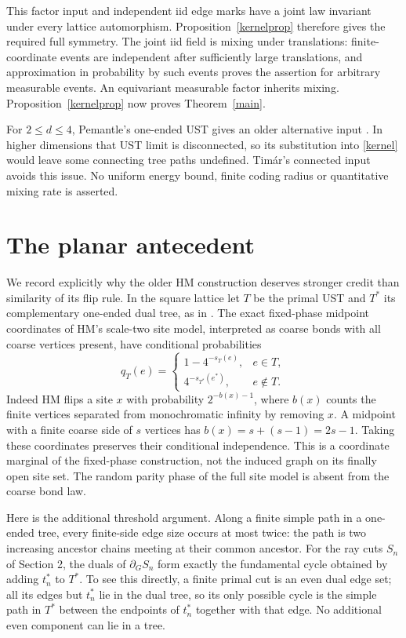 \documentclass[11pt]{article}
\newcommand{\bd}{\partial}
\begin{document}
This factor input and independent iid edge marks have a joint law invariant under every lattice automorphism. Proposition~\ref{kernelprop} therefore gives the required full symmetry. The joint iid field is mixing under translations: finite-coordinate events are independent after sufficiently large translations, and approximation in probability by such events proves the assertion for arbitrary measurable events. An equivariant measurable factor inherits mixing. Proposition~\ref{kernelprop} now proves Theorem~\ref{main}.

For $2\le d\le4$, Pemantle's one-ended UST gives an older alternative input \cite[Theorems 2.3 and 4.3]{P}. In higher dimensions that UST limit is disconnected, so its substitution into \eqref{kernel} would leave some connecting tree paths undefined. Tim\'ar's connected input avoids this issue. No uniform energy bound, finite coding radius or quantitative mixing rate is asserted.

\section{The planar antecedent}\label{planar}
We record explicitly why the older HM construction deserves stronger credit than similarity of its flip rule. In the square lattice let $T$ be the primal UST and $T^*$ its complementary one-ended dual tree, as in \cite[Section 2]{HM}. The exact fixed-phase midpoint coordinates of HM's scale-two site model, interpreted as coarse bonds with all coarse vertices present, have conditional probabilities
\begin{equation}\label{hmkernel}
 q_T(e)=
 \begin{cases}
 1-4^{-s_T(e)},&e\in T,\\
 4^{-s_{T^*}(e^*)},&e\notin T.
 \end{cases}
\end{equation}
Indeed HM flips a site $x$ with probability $2^{-b(x)-1}$, where $b(x)$ counts the finite vertices separated from monochromatic infinity by removing $x$. A midpoint with a finite coarse side of $s$ vertices has $b(x)=s+(s-1)=2s-1$. Taking these coordinates preserves their conditional independence. This is a coordinate marginal of the fixed-phase construction, not the induced graph on its finally open site set. The random parity phase of the full site model is absent from the coarse bond law.

Here is the additional threshold argument. Along a finite simple path in a one-ended tree, every finite-side edge size occurs at most twice: the path is two increasing ancestor chains meeting at their common ancestor. For the ray cuts $S_n$ of Section 2, the duals of $\bd_G S_n$ form exactly the fundamental cycle obtained by adding $t_n^*$ to $T^*$. To see this directly, a finite primal cut is an even dual edge set; all its edges but $t_n^*$ lie in the dual tree, so its only possible cycle is the simple path in $T^*$ between the endpoints of $t_n^*$ together with that edge. No additional even component can lie in a tree.
\end{document}

